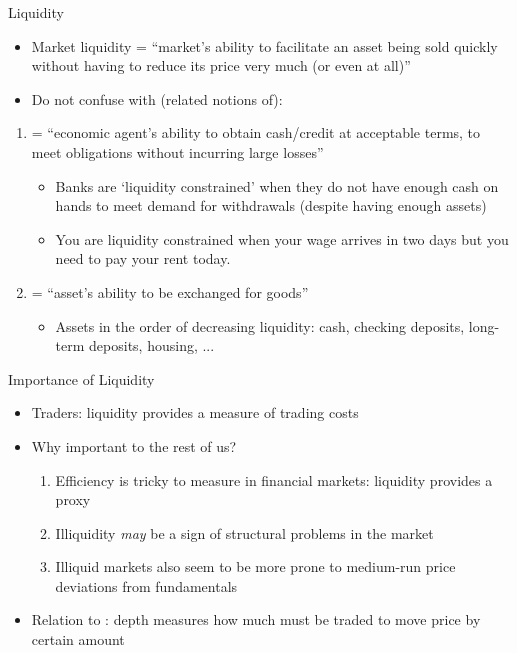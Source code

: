 \begin{frame}{Liquidity}
\begin{itemize}
	\item \alert{Market liquidity} = ``market's ability to facilitate an asset being sold quickly without having to reduce its price very much (or even at all)''
	\item Do not confuse with (related notions of):
\end{itemize}
\begin{enumerate}
	\item {} = ``economic agent's ability to obtain cash/credit at acceptable terms, to meet obligations without incurring large losses''
	\begin{itemize}
		\item Banks are `liquidity constrained' when they do not have enough cash on hands to meet demand for withdrawals (despite having enough assets)
		\item You are liquidity constrained when your wage arrives in two days but you need to pay your rent today.
	\end{itemize}
	\item {} = ``asset's ability to be exchanged for goods''
	\begin{itemize}
		\item Assets in the order of decreasing liquidity: cash, checking deposits, long-term deposits, housing, ...
	\end{itemize}
\end{enumerate}
\end{frame}


\begin{frame}{Importance of Liquidity}
\begin{itemize}
	\item Traders: liquidity provides a measure of trading costs
	\item Why important to the rest of us?
	\begin{enumerate}
		\item Efficiency is tricky to measure in financial markets: liquidity provides a proxy
		\item Illiquidity \textit{may} be a sign of structural problems in the market
		\item Illiquid markets also seem to be more prone to medium-run price deviations from fundamentals
	\end{enumerate}
	\item Relation to : depth measures how much must be traded to move price by certain amount
\end{itemize}
\end{frame}


